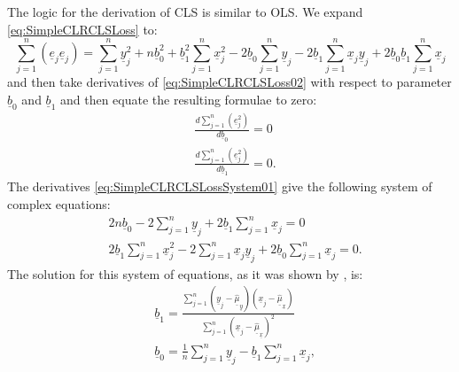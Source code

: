 \documentclass[
]{book}
\begin{document}
The logic for the derivation of CLS is similar to OLS. We expand \eqref{eq:SimpleCLRCLSLoss} to:
\begin{equation}
    \sum_{j=1}^n (\underline{e}_j \underline{e}_j) = \sum_{j=1}^n \underline{y}_j^2 + n \underline{b}_0^2 + \underline{b}_1^2 \sum_{j=1}^n \underline{x}_j^2 - 2 \underline{b}_0 \sum_{j=1}^n \underline{y}_j - 2 \underline{b}_1 \sum_{j=1}^n \underline{x}_j \underline{y}_j + 2 \underline{b}_0 \underline{b}_1 \sum_{j=1}^n \underline{x}_j 
    \label{eq:SimpleCLRCLSLoss02}
\end{equation}
and then take derivatives of \eqref{eq:SimpleCLRCLSLoss02} with respect to parameter \(\underline{b}_0\) and \(\underline{b}_1\) and then equate the resulting formulae to zero:
\begin{equation}
    \begin{aligned}
        & \frac{d \sum_{j=1}^n (\underline{e}_j^2)}{d \underline{b}_0} = 0 \\
        & \frac{d \sum_{j=1}^n (\underline{e}_j^2)}{d \underline{b}_1} = 0 .
    \end{aligned}
    \label{eq:SimpleCLRCLSLossSystem01}
\end{equation}
The derivatives \eqref{eq:SimpleCLRCLSLossSystem01} give the following system of complex equations:
\begin{equation}
    \begin{aligned}
        & 2 n \underline{b}_0 - 2 \sum_{j=1}^n \underline{y}_j + 2 \underline{b}_1 \sum_{j=1}^n \underline{x}_j = 0 \\
        & 2 \underline{b}_1 \sum_{j=1}^n \underline{x}_j^2 - 2 \sum_{j=1}^n \underline{x}_j \underline{y}_j + 2 \underline{b}_0 \sum_{j=1}^n \underline{x}_j = 0 .
    \end{aligned}
    \label{eq:SimpleCLRCLSLossSystem02}
\end{equation}
The solution for this system of equations, as it was shown by \citet{Svetunkov2012}, is:
\begin{equation}
    \begin{aligned}
        & \underline{b}_1 = \frac{\sum_{j=1}^n (\underline{y}_{j}-\underline{\hat{\mu}}_{\underline{y}}) (\underline{x}_j-\underline{\hat{\mu}}_{\underline{x}})}{\sum_{j=1}^n (\underline{x}_j-\underline{\hat{\mu}}_{\underline{x}})^2} \\
        & \underline{b}_0 = \frac{1}{n} \sum_{j=1}^n \underline{y}_j - \underline{b}_1 \sum_{j=1}^n \underline{x}_j ,
    \end{aligned}
    \label{eq:SimpleCLRCLSLossParameters}
\end{equation}
\end{document}
